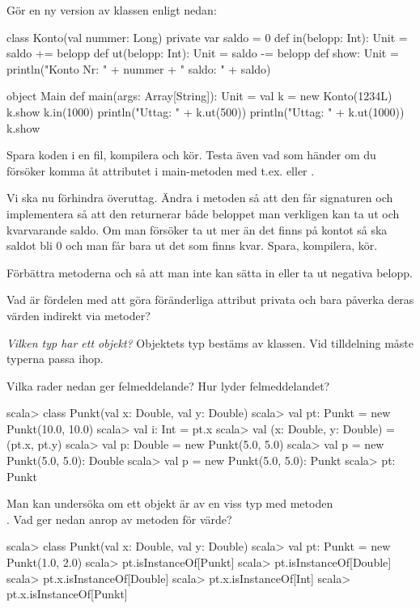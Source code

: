 \Subtask Gör en ny version av klassen  enligt nedan:

\begin{Code}
class Konto(val nummer: Long){ 
  private var saldo = 0
  def in(belopp: Int): Unit = {saldo += belopp}
  def ut(belopp: Int): Unit = {saldo -= belopp}
  def show: Unit = 
    println("Konto Nr: " + nummer + " saldo: " + saldo) 
}

object Main {
  def main(args: Array[String]): Unit = {
    val k = new Konto(1234L)
    k.show
    k.in(1000)
    println("Uttag: " + k.ut(500))
    println("Uttag: " + k.ut(1000))
    k.show
  }
}
\end{Code}

\Subtask Spara koden i en fil, kompilera och kör. Testa även vad som händer om du försöker komma åt attributet  i main-metoden med t.ex.  eller . 

\Subtask Vi ska nu förhindra överuttag. Ändra i metoden  så att den får signaturen  och implementera  så att den returnerar både beloppet man verkligen kan ta ut och kvarvarande saldo. Om man försöker ta ut mer än det finns på kontot så ska saldot bli 0 och man får bara ut det som finns kvar. Spara, kompilera, kör. 

\Subtask Förbättra metoderna  och  så att man inte kan sätta in eller ta ut negativa belopp.

\Subtask Vad är fördelen med att göra föränderliga attribut privata och bara påverka deras värden indirekt via metoder?

\Task \emph{Vilken typ har ett objekt?} Objektets typ bestäms av klassen. Vid tilldelning måste typerna passa ihop.

\Subtask Vilka rader nedan ger felmeddelande? Hur lyder felmeddelandet?
\begin{REPL}
scala> class Punkt(val x: Double, val y: Double)
scala> val pt: Punkt = new Punkt(10.0, 10.0)
scala> val i: Int = pt.x
scala> val (x: Double, y: Double) = (pt.x, pt.y)
scala> val p: Double = new Punkt(5.0, 5.0)
scala> val p = new Punkt(5.0, 5.0): Double
scala> val p = new Punkt(5.0, 5.0): Punkt
scala> pt: Punkt
\end{REPL}


\Subtask Man kan undersöka om ett objekt är av en viss typ med metoden \\ . Vad ger nedan anrop av metoden  för värde?
\begin{REPL}
scala> class Punkt(val x: Double, val y: Double)
scala> val pt: Punkt = new Punkt(1.0, 2.0)
scala> pt.isInstanceOf[Punkt]
scala> pt.isInstanceOf[Double]
scala> pt.x.isInstanceOf[Double]
scala> pt.x.isInstanceOf[Int]
scala> pt.x.isInstanceOf[Punkt]
\end{REPL}

